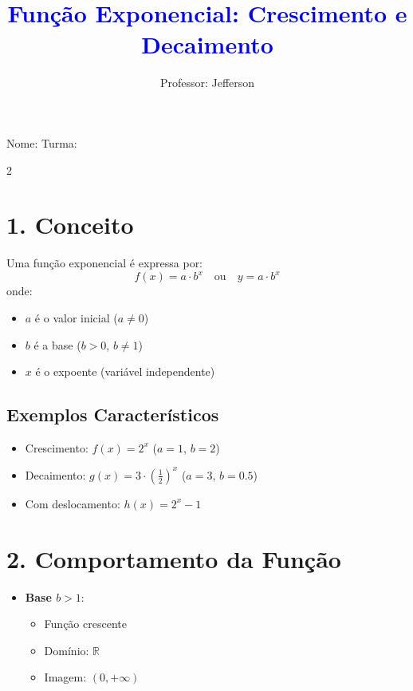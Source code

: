 \documentclass[11pt]{article}
\title{\textcolor{blue}{Função Exponencial: Crescimento e Decaimento}}
\author{Professor: Jefferson}
\date{}
\begin{document}
\maketitle
\vspace{-1cm}

\begin{center}
    \large{Nome: \underline{\hspace{8cm}} \quad Turma: \underline{\hspace{3cm}}}
\end{center}

\begin{multicols}{2}

    \section*{1. Conceito}
    Uma função exponencial é expressa por:
    \[
        f(x) = a \cdot b^x \quad \text{ou} \quad y = a \cdot b^x
    \]
    onde:
    \begin{itemize}
        \item $a$ é o valor inicial ($a \neq 0$)
        \item $b$ é a base ($b > 0$, $b \neq 1$)
        \item $x$ é o expoente (variável independente)
    \end{itemize}

    \subsection*{Exemplos Característicos}
    \begin{itemize}
        \item Crescimento: $f(x) = 2^x$ \quad ($a=1$, $b=2$)
        \item Decaimento: $g(x) = 3 \cdot \left(\frac{1}{2}\right)^x$ \quad ($a=3$, $b=0.5$)
        \item Com deslocamento: $h(x) = 2^{x} - 1$
    \end{itemize}

    \section*{2. Comportamento da Função}
    \begin{itemize}
        \item \textbf{Base $b > 1$}:
            \begin{itemize}
                \item Função crescente
                \item Domínio: $\mathbb{R}$
                \item Imagem: $(0, +\infty)$
            \end{itemize}


\end{itemize}
\end{multicols}
\end{document}
